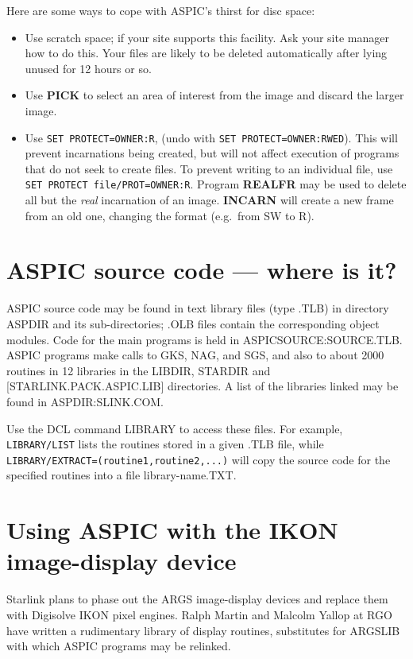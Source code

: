 Here are some ways to cope with ASPIC's thirst for disc space:
\begin{itemize}
\item Use scratch space; if your site supports this facility.
Ask your site manager how to do this.
Your files are likely to be deleted automatically after lying unused for
12 hours or so.
\item Use {\bf PICK} to select an area of interest from the image and discard
the larger image.
\item Use {\tt SET PROTECT=OWNER:R}, (undo with {\tt SET PROTECT=OWNER:RWED}).
This will prevent incarnations being created, but will not affect execution
of programs that do not seek to create files.
To prevent writing to an individual file, use {\tt SET PROTECT
file/PROT=OWNER:R}.
Program {\bf REALFR} may be used to delete all but the {\em real} incarnation
of an image.
{\bf INCARN} will create a new frame from an old one, changing the format
(e.g.\ from SW to R).
\end{itemize}

\section {ASPIC source code --- where is it?}

ASPIC source code may be found in text library files (type .TLB) in directory
ASPDIR and its sub-directories; .OLB files contain the corresponding object
modules.
Code for the main programs is held in ASPICSOURCE:SOURCE.TLB.
ASPIC programs make calls to GKS, NAG, and SGS, and also to about 2000 routines
in 12 libraries in the LIBDIR, STARDIR and [STARLINK.PACK.ASPIC.LIB]
directories.
A list of the libraries linked may be found in ASPDIR:SLINK.COM.

Use the DCL command LIBRARY to access these files.
For example, {\tt LIBRARY/LIST} lists the routines stored in a given .TLB file,
while {\tt LIBRARY/EXTRACT=(routine1,routine2,...)} will copy the source code
for the specified routines into a file library-name.TXT.

\section{Using ASPIC with the IKON image-display device}

Starlink plans to phase out the ARGS image-display devices and replace them
with Digisolve IKON pixel engines.
Ralph Martin and Malcolm Yallop at RGO have written a rudimentary library
of display routines, substitutes for ARGSLIB with which ASPIC programs may
be relinked.

